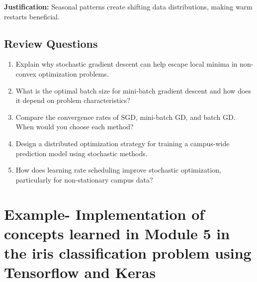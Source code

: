 \documentclass[
  letterpaper,
  DIV=11,
  numbers=noendperiod]{scrreprt}
\begin{document}
\textbf{Justification:} Seasonal patterns create shifting data
distributions, making warm restarts beneficial.

\subsection{Review Questions}\label{review-questions-19}

\begin{enumerate}
\def\labelenumi{\arabic{enumi}.}
\item
  Explain why stochastic gradient descent can help escape local minima
  in non-convex optimization problems.
\item
  What is the optimal batch size for mini-batch gradient descent and how
  does it depend on problem characteristics?
\item
  Compare the convergence rates of SGD, mini-batch GD, and batch GD.
  When would you choose each method?
\item
  Design a distributed optimization strategy for training a campus-wide
  prediction model using stochastic methods.
\item
  How does learning rate scheduling improve stochastic optimization,
  particularly for non-stationary campus data?
\end{enumerate}

\section{Example- Implementation of concepts learned in Module 5 in the
iris classification problem using Tensorflow and
Keras}\label{example--implementation-of-concepts-learned-in-module-5-in-the-iris-classification-problem-using-tensorflow-and-keras}
\end{document}
